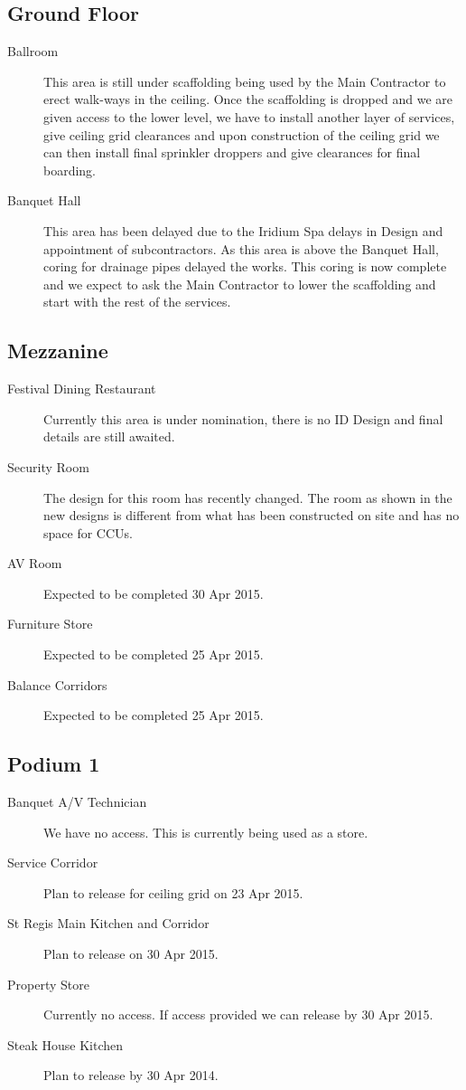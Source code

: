 \subsection{Ground Floor}
\begin{description}
\item[Ballroom] This area is still under scaffolding being used by the Main Contractor to erect walk-ways in the ceiling. Once the scaffolding is dropped and we are given access to the lower level, we have to install another layer of services, give ceiling grid clearances and upon construction of the ceiling grid we can then install final sprinkler droppers and give clearances for final boarding.
\item[Banquet Hall] This area has been delayed due to the Iridium Spa delays in Design and appointment of subcontractors. As this area is above the Banquet Hall, coring for drainage pipes delayed the works. This coring is now complete and we expect to ask the Main Contractor to lower the scaffolding and start with the rest of the services.
\end{description}
\subsection{Mezzanine}
\begin{description}
\item[Festival Dining Restaurant] Currently this area is under nomination, there is no ID Design and final details are still awaited. 
\item[Security Room] The design for this room has recently changed. The room as shown in the new designs is different from what has been constructed on site and has no space for CCUs. 
\item[AV Room] Expected to be completed 30 Apr 2015.
\item[Furniture Store] Expected to be completed 25 Apr 2015.
\item[Balance Corridors] Expected to be completed 25 Apr 2015.
\end{description}

\subsection{Podium 1}

\begin{description}
\item[Banquet A/V Technician] We have no access. This is currently being used as a store.
\item[Service Corridor] Plan to release for ceiling grid on 23 Apr 2015.
\item[St Regis Main Kitchen and Corridor] Plan to release on 30 Apr 2015.
\item[Property Store] Currently no access. If access provided we can release by 30 Apr 2015.
\item[Steak House Kitchen] Plan to release by 30 Apr 2014.
\end{description}


